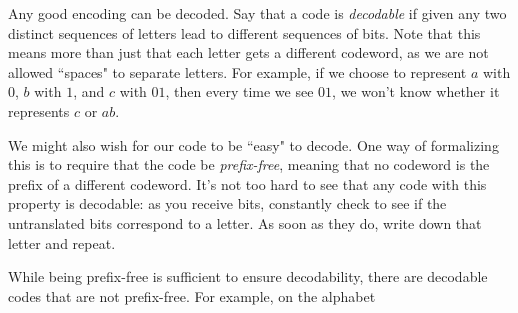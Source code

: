 \documentclass[11pt, oneside]{article}   	%
\begin{document}
Any good encoding can be decoded. Say that a code is {\em decodable} if given any two distinct sequences of letters lead to different sequences of bits. Note that this means more than just that each letter gets a different codeword, as we are not allowed ``spaces" to separate letters. For example, if we choose to represent $a$ with $0$, $b$ with $1$, and $c$ with $01$, then every time we see $01$, we won't know whether it represents $c$ or $ab$.

We might also wish for our code to be ``easy" to decode. One way of formalizing this is to require that the code be {\em prefix-free}, meaning that no codeword is the prefix of a different codeword. It's not too hard to see that any code with this property is decodable: as you receive bits, constantly check to see if the untranslated bits correspond to a letter. As soon as they do, write down that letter and repeat.

While being prefix-free is sufficient to ensure decodability, there are decodable codes that are not prefix-free. For example, on the alphabet 
\end{document}
